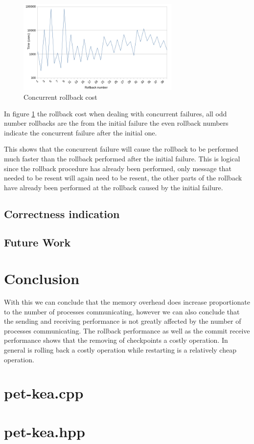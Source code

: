\documentclass[twocolumn, a4paper,11pt]{article}%
\begin{document}
\par
\begin{figure}[h]
	\includegraphics[width=8cm]{concurrent_rollback_cost_new.png}
	\caption{Concurrent rollback cost}
	\label{fig:concurrent_rollback}
\end{figure}\noindent
In figure \ref{fig:concurrent_rollback} the rollback cost when dealing with concurrent failures, all odd  number rollbacks are the from the initial failure the even rollback numbers indicate the concurrent failure after the initial one.
\par This shows that the concurrent failure will cause the rollback to be performed much faster than the rollback performed after the initial failure. This is logical since the rollback procedure has already been performed, only message that needed to be resent will again need to be resent, the other parts of the rollback have already been performed at the rollback caused by the initial failure.


\subsection{Correctness indication}%



\subsection{Future Work}


\section{Conclusion}
With this we can conclude that the memory overhead does increase proportionate to the number of processes communicating, however we can also conclude that the sending and receiving performance is not greatly affected by the number of processes communicating. The rollback performance as well as the commit receive performance shows that the removing of checkpoints a costly operation. In general is rolling back a costly operation while restarting is a relatively cheap operation.
\newpage
\onecolumn

\appendix

\section{pet-kea.cpp}



\section{pet-kea.hpp}






\end{document}
